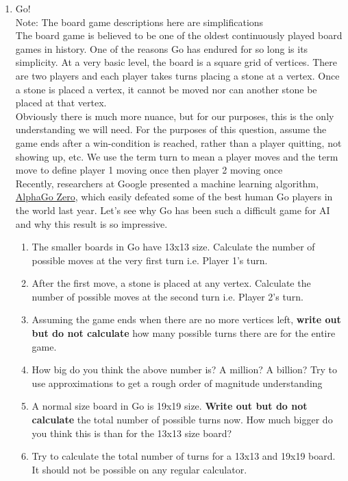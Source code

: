 \documentclass{article}
\begin{document}
\begin{enumerate}
    \item Go!\\
    Note: The board game descriptions here are simplifications\\
    The board game is believed to be one of the oldest continuously played board games in history. One of the reasons Go has endured for so long is its simplicity. At a very basic level, the board is a square grid of vertices. There are two players and each player takes turns placing a stone at a vertex. Once a stone is placed a vertex, it cannot be moved nor can another stone be placed at that vertex.\\ Obviously there is much more nuance, but for our purposes, this is the only understanding we will need. For the purposes of this question, assume the game ends after a win-condition is reached, rather than a player quitting, not showing up, etc. We use the term turn to mean a player moves and the term move to define player 1 moving once then player 2 moving once\\
    Recently, researchers at Google presented a machine learning algorithm,  \href{https://deepmind.com/blog/alphago-zero-learning-scratch/}{AlphaGo Zero}, which easily defeated some of the best human Go players in the world last year. Let's see why Go has been such a difficult game for AI and why this result is so impressive.
    \begin{enumerate}
        \item The smaller boards in Go have 13x13 size. Calculate the number of possible moves at the very first turn i.e. Player 1's turn.
        \item After the first move, a stone is placed at any vertex. Calculate the number of possible moves at the second turn i.e. Player 2's turn.
        \item Assuming the game ends when there are no more vertices left, \textbf{write out but do not calculate} how many possible turns there are for the entire game.
        \item How big do you think the above number is? A million? A billion? Try to use approximations to get a rough order of magnitude understanding
        \item A normal size board in Go is 19x19 size. \textbf{Write out but do not calculate} the total number of possible turns now. How much bigger do you think this is than for the 13x13 size board?
        \item Try to calculate the total number of turns for a 13x13 and 19x19 board. It should not be possible on any regular calculator.

\end{enumerate}
\end{enumerate}
\end{document}
